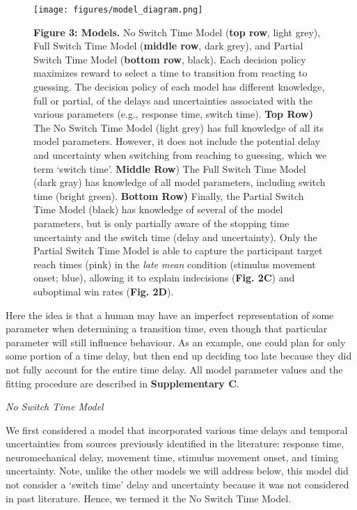 \documentclass[12pt]{article}
\newcommand\boldblue[1]{\textcolor{mydarkblue}{\textbf{#1}}}
\begin{document}
\begin{figure}[H]
  \centering
  \texttt{[image: figures/model\_diagram.png]}

  \caption*{%
    \boldblue{Figure 3: Models.} No Switch Time Model (\boldblue{top row}, light grey), Full Switch Time Model (\boldblue{middle row}, dark grey), and Partial Switch Time Model (\boldblue{bottom row}, black). Each decision policy maximizes reward to select a time to transition from reacting to guessing. The decision policy of each model has different knowledge, full or partial, of the delays and uncertainties associated with the various parameters (e.g., response time, switch time). \boldblue{Top Row)} The No Switch Time Model (light grey) has full knowledge of all its model parameters. However, it does not include the potential delay and uncertainty when switching from reaching to guessing, which we term ‘switch time’.  \boldblue{Middle Row}) The Full Switch Time Model (dark gray) has knowledge of all model parameters, including switch time (bright green). \boldblue{Bottom Row)} Finally, the Partial Switch Time Model (black) has knowledge of several of the model parameters, but is only partially aware of the stopping time uncertainty and the switch time (delay and uncertainty). Only the Partial Switch Time Model is able to capture the participant target reach times (pink) in the \emph{late mean} condition (stimulus movement onset; blue), allowing it to explain indecisions (\boldblue{Fig. 2C}) and suboptimal win rates (\boldblue{Fig. 2D}).
    }
\end{figure}

\noindent Here the idea is that a human may have an imperfect representation of some parameter when determining a transition time, even though that particular parameter will still influence behaviour. As an example, one could plan for only some portion of a time delay, but then end up deciding too late because they did not fully account for the entire time delay. All model parameter values and the fitting procedure are described in \boldblue{Supplementary C}. 

\vspace*{1mm}
\noindent\emph{{No Switch Time Model}}

\noindent We first considered a model that incorporated various time delays and temporal uncertainties from sources previously identified in the literature: response time, neuromechanical delay, movement time, stimulus movement onset, and timing uncertainty. Note, unlike the other models we will address below, this model did not consider a `switch time’ delay and uncertainty because it was not considered in past literature. Hence, we termed it the No Switch Time Model.
\end{document}
